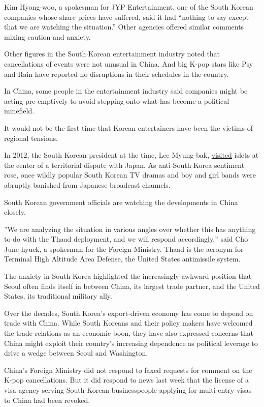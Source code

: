 Kim Hyong-woo, a spokesman for JYP Entertainment, one of the South
Korean companies whose share prices have suffered, said it had ``nothing
to say except that we are watching the situation.'' Other agencies
offered similar comments mixing caution and anxiety.

Other figures in the South Korean entertainment industry noted that
cancellations of events were not unusual in China. And big K-pop stars
like Psy and Rain have reported no disruptions in their schedules in the
country.

In China, some people in the entertainment industry said companies might
be acting pre-emptively to avoid stepping onto what has become a
political minefield.

It would not be the first time that Korean entertainers have been the
victims of regional tensions.

In 2012, the South Korean president at the time, Lee Myung-bak,
\href{http://www.nytimes.com/2012/08/11/world/asia/south-koreans-visit-to-disputed-islets-angers-japan.html}{visited}
islets at the center of a territorial dispute with Japan. As anti-South
Korea sentiment rose, once wildly popular South Korean TV dramas and boy
and girl bands were abruptly banished from Japanese broadcast channels.

South Korean government officials are watching the developments in China
closely.

''We are analyzing the situation in various angles over whether this has
anything to do with the Thaad deployment, and we will respond
accordingly,'' said Cho June-hyuck, a spokesman for the Foreign
Ministry. Thaad is the acronym for Terminal High Altitude Area Defense,
the United States antimissile system.

The anxiety in South Korea highlighted the increasingly awkward position
that Seoul often finds itself in between China, its largest trade
partner, and the United States, its traditional military ally.

Over the decades, South Korea's export-driven economy has come to depend
on trade with China. While South Koreans and their policy makers have
welcomed the trade relations as an economic boon, they have also
expressed concerns that China might exploit their country's increasing
dependence as political leverage to drive a wedge between Seoul and
Washington.

China's Foreign Ministry did not respond to faxed requests for comment
on the K-pop cancellations. But it did respond to news last week that
the license of a visa agency serving South Korean businesspeople
applying for multi-entry visas to China had been revoked.

